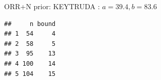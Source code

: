 \begin{frame}[fragile]{ORR+N prior: KEYTRUDA : \(a=39.4, b=83.6\)}
\begin{verbatim}
##     n bound
## 1  54     4
## 2  58     5
## 3  95    13
## 4 100    14
## 5 104    15
\end{verbatim}

\begin{Shaded}
\begin{Highlighting}[]
\NormalTok{(}\NormalTok{, }\NormalTok{, }  \NormalTok{, } \NormalTok{, } \NormalTok{)}
\NormalTok{(}\NormalTok{, }\NormalTok{, }  \NormalTok{, } \NormalTok{, } \NormalTok{)}
\end{Highlighting}
\end{Shaded}

\end{frame}

